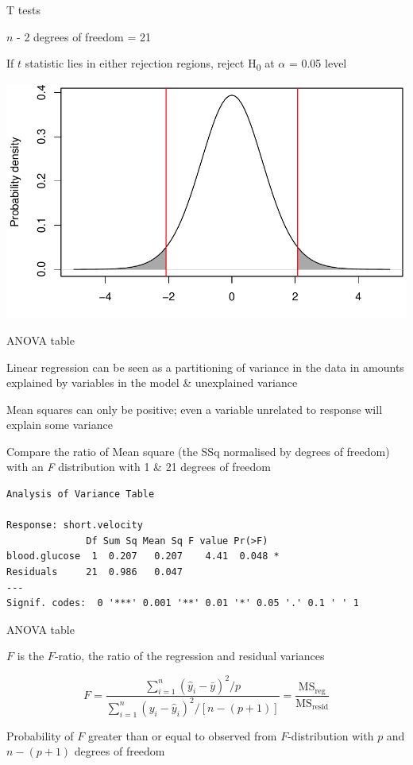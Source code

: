 \documentclass[10pt,ignorenonframetext,compress, aspectratio=169]{beamer}
\begin{document}
\begin{frame}{T tests}

\(n\) - 2 degrees of freedom = 21

If \(t\) statistic lies in either rejection regions, reject
H\textsubscript{0} at \(\alpha\) = 0.05 level

\begin{center}\includegraphics[width=0.7\linewidth]{03-linear-models_files/figure-beamer/rejection-regions-plot-1} \end{center}

\end{frame}

\begin{frame}[fragile]{ANOVA table}

Linear regression can be seen as a partitioning of variance in the data
in amounts explained by variables in the model \& unexplained variance

\alert{Mean squares} can only be positive; even a variable unrelated to
response will explain some variance

Compare the ratio of Mean square (the SSq normalised by degrees of
freedom) with an \emph{F} distribution with 1 \& 21 degrees of freedom

\scriptsize

\begin{verbatim}
Analysis of Variance Table

Response: short.velocity
              Df Sum Sq Mean Sq F value Pr(>F)  
blood.glucose  1  0.207   0.207    4.41  0.048 *
Residuals     21  0.986   0.047                 
---
Signif. codes:  0 '***' 0.001 '**' 0.01 '*' 0.05 '.' 0.1 ' ' 1
\end{verbatim}

\normalsize

\end{frame}

\begin{frame}{ANOVA table}

\(F\) is the \(F\)-ratio, the ratio of the regression and residual
variances

\[F = \frac{\sum\limits^n_{i=1}(\hat{y}_i - \bar{y})^2 / p}{\sum\limits^n_{i=1}(y_i - \hat{y}_i)^2 / [n-(p+1)]} = \frac{\mathrm{MS_{reg}}}{\mathrm{MS_{resid}}}\]

Probability of \(F\) greater than or equal to observed from
\(F\)-distribution with \(p\) and \(n - (p + 1)\) degrees of freedom

\end{frame}
\end{document}
